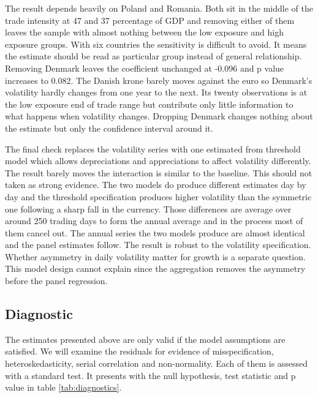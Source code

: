 \vspace{\baselineskip}

The result depends heavily on Poland and Romania.
Both sit in the middle of the trade intensity at 47 and 37 percentage of GDP and removing either of them leaves the sample with almost nothing between the low exposure and high exposure groups.
With six countries the sensitivity is difficult to avoid.
It means the estimate should be read as particular group instead of general relationship.
Removing Denmark leaves the coefficient unchanged at -0.096 and p value increases to 0.082.
The Danish krone barely moves against the euro so Denmark's volatility hardly changes from one year to the next.
Its twenty observations is at the low exposure end of trade range but contribute only little information to what happens when volatility changes.
Dropping Denmark changes nothing about the estimate but only the confidence interval around it.

\vspace{\baselineskip}

The final check replaces the volatility series with one estimated from threshold model which allows depreciations and appreciations to affect volatility differently.
The result barely moves the interaction is similar to the baseline.
This should not taken as strong evidence.
The two models do produce different estimates day by day and the threshold specification produces higher volatility than the symmetric one following a sharp fall in the currency.
Those differences are average over around 250 trading days to form the annual average and in the process most of them cancel out.
The annual series the two models produce are almost identical and the panel estimates follow.
The result is robust to the volatility specification.
Whether asymmetry in daily volatility matter for growth is a separate question.
This model design cannot explain since the aggregation removes the asymmetry before the panel regression.

\subsection{Diagnostic}\label{subsec:diagnostic}

The estimates presented above are only valid if the model assumptions are satisfied.
We will examine the residuals for evidence of misspecification, heteroskedasticity, serial correlation and non-normality.
Each of them is assessed with a standard test.
It presents with the null hypothesis, test statistic and p value in table \ref{tab:diagnostics}.

